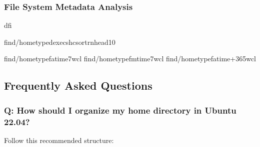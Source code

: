 \documentclass[letterpaper,10pt,english]{sphinxmanual}
\begin{document}
\subsubsection{File System Metadata Analysis}
\label{\detokenize{data-organization:file-system-metadata-analysis}}
\begin{sphinxVerbatim}[commandchars=\\\{\}]
df\PYGZhy{}i

find/home\PYGZhy{}typed\PYGZhy{}execsh\PYGZhy{}c\PYGZus{}sort\PYGZhy{}rnhead\PYGZhy{}10

find/home\PYGZhy{}typef\PYGZhy{}atime\PYGZhy{}7wc\PYGZhy{}l
find/home\PYGZhy{}typef\PYGZhy{}mtime\PYGZhy{}7wc\PYGZhy{}l
find/home\PYGZhy{}typef\PYGZhy{}atime+365wc\PYGZhy{}l
\end{sphinxVerbatim}


\subsection{Frequently Asked Questions}
\label{\detokenize{data-organization:frequently-asked-questions}}

\subsubsection{Q: How should I organize my home directory in Ubuntu 22.04?}
\label{\detokenize{data-organization:q-how-should-i-organize-my-home-directory-in-ubuntu-22-04}}
\sphinxAtStartPar
{} Follow this recommended structure:
\end{document}
